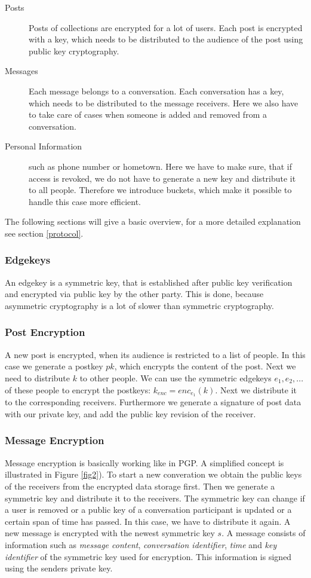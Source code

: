 \documentclass{scrartcl}
\begin{document}
\begin{description}
  \item[Posts] Posts of collections are encrypted for a lot of users. Each post is encrypted with a key, which needs to be distributed to the audience of the post using public key cryptography.
  \item[Messages] Each message belongs to a conversation. Each conversation has a key, which needs to be distributed to the message receivers. Here we also have to take care of cases when someone is added and removed from a conversation.
  \item[Personal Information] such as phone number or hometown. Here we have to make sure, that if access is revoked, we do not have to generate a new key and distribute it to all people. Therefore we introduce buckets, which make it possible to handle this case more efficient.
\end{description}

The following sections will give a basic overview, for a more detailed explanation see section \ref{protocol}.
 \subsubsection{Edgekeys}
 An edgekey is a symmetric key, that is established after public key verification and encrypted via public key by the other party. This is done, because asymmetric cryptography is a lot of slower than symmetric cryptography.
 \subsubsection{Post Encryption}
A new post is encrypted, when its audience is restricted to a list of people. 
In this case we generate a postkey $pk$, which encrypts the content of the post. Next we need to distribute $k$ to other people. We can use the symmetric edgekeys $e_1, e_2, ...$ of these people to encrypt the postkeys: $k_{enc} = enc_{e_1} (k)$. Next we distribute it to the corresponding receivers. Furthermore we generate a signature of post data with our private key, and add the public key revision of the receiver.
 \subsubsection{Message Encryption}
 
  Message encryption is basically working like in PGP. A simplified concept is illustrated in Figure \ref{fig2}). 
To start a new converation we obtain the public keys of the receivers from the encrypted data storage first. Then we generate a symmetric key and distribute it to the receivers. The symmetric key can change if a user is removed or a public key of a conversation participant is updated or a certain span of time has passed. In this case, we have to distribute it again. A new message is encrypted with the newest symmetric key $s$.
A message consists of information such as \textit{message content}, \textit{conversation identifier}, \textit{time} and \textit{key identifier} of the symmetric key used for encryption. This information is  signed using the senders private key.
\end{document}
